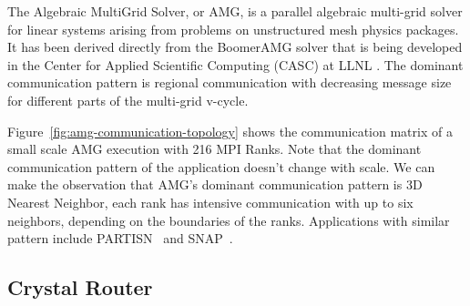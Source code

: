
The Algebraic MultiGrid Solver, or AMG, 
is a parallel algebraic multi-grid solver for linear systems arising from problems on unstructured mesh physics packages. 
It has been derived directly from the BoomerAMG solver 
that is being developed in the Center for Applied Scientific Computing (CASC) at LLNL \cite{amg}. 
The dominant communication pattern is regional communication 
with decreasing message size for different parts of the multi-grid v-cycle.

Figure~\ref{fig:amg-communication-topology} shows the communication matrix 
of a small scale AMG execution with 216 MPI Ranks. 
Note that the dominant communication pattern of the application doesn't change with scale. 
We can make the observation that AMG's dominant communication pattern is 3D Nearest Neighbor, 
each rank has intensive communication with up to six neighbors, 
depending on the boundaries of the ranks. 
Applications with similar pattern include PARTISN~\cite{partisn} and SNAP~\cite{snap}.


\subsection{Crystal Router}
\label{sec:crystalrouter}

